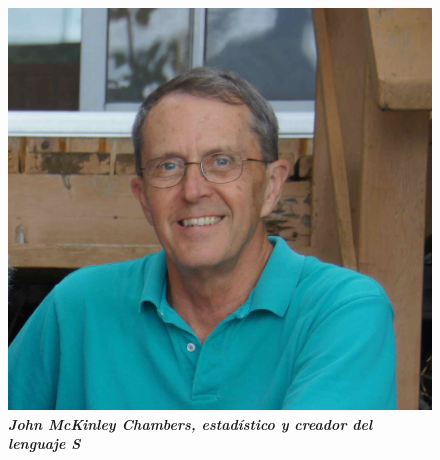 \documentclass[preview,border={-20pt 0pt -20pt 0pt}]{standalone}
\begin{document}
	\begin{figure}[H]
		\centering
		\includegraphics[height=0.5\textheight]{chambers.jpg}
		\caption*{\bfseries\itshape John McKinley Chambers, estadístico y creador del lenguaje S}
	\end{figure}
\end{document}
